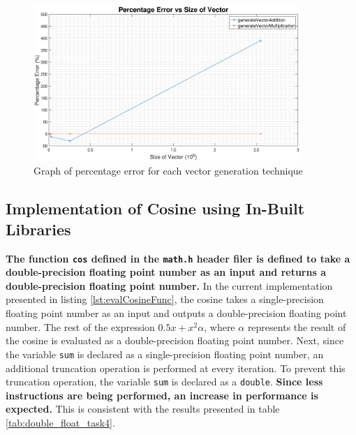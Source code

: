\documentclass{article}
\begin{document}
\begin{figure}[H]
    \centering
    \includegraphics[width=0.9\textwidth]{graph4.eps}
    \caption{Graph of percentage error for each vector generation technique}
    \label{fig:task4_accuracy}
\end{figure}



\subsection{Implementation of Cosine using In-Built Libraries}

\textbf{The function {\tt cos} defined in the {\tt math.h} header filer is defined to take a double-precision floating point number as an input and returns a double-precision floating point number.} In the current implementation presented in listing \ref{lst:evalCosineFunc}, the cosine takes a single-precision floating point number as an input and outputs a double-precision floating point number. The rest of the expression $0.5x+x^{2}\alpha$, where $\alpha$ represents the result of the cosine is evaluated as a double-precision floating point number. Next, since the variable {\tt sum} is declared as a single-precision floating point number, an additional truncation operation is performed at every iteration. To prevent this truncation operation, the variable {\tt sum} is declared as a {\tt double}. \textbf{Since less instructions are being performed, an increase in performance is expected.} This is consistent with the results presented in table \ref{tab:double_float_task4}.
\end{document}
